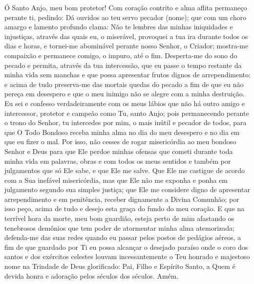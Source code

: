 \documentclass{subfiles}
\begin{document}
Ó Santo Anjo, meu bom protetor! Com coração contrito e alma aflita permaneço
perante ti, pedindo: Dá ouvidos ao teu servo pecador (nome); que com um choro
amargo e lamento profundo clama: Não te lembres das minhas iniquidades e
injustiças, através das quais eu, o miserável, provoquei a tua ira durante todos
os dias e horas, e tornei-me abominável perante nosso Senhor, o Criador;
mostra-me compaixão e permanece comigo, o impuro, até o fim. Desperta-me do sono
do pecado e permita, através da tua intercessão, que eu passe o tempo restante
da minha vida sem manchas e que possa apresentar frutos dignos de
arrependimento; e acima de tudo preserva-me das mortais quedas do pecado a fim
de que eu não pereça em desespero e que o meu inimigo não se alegre com a minha
destruição. Eu sei e confesso verdadeiramente com os meus lábios que não há
outro amigo e intercessor, protetor e campeão como Tu, santo Anjo; pois
permanecendo perante o trono do Senhor, tu intercedes por mim, o mais inútil e
pecador de todos, para que O Todo Bondoso receba minha alma no dia do meu
desespero e no dia em que eu fizer o mal. Por isso, não cesses de rogar
misericórdia ao meu bondoso Senhor e Deus para que Ele perdoe minhas ofensas que
cometi durante toda minha vida em palavras, obras e com todos os meus sentidos e
também por julgamentos que só Ele sabe, e que Ele me salve. Que Ele me castigue
de acordo com a Sua inefável misericórdia, mas que Ele não me exponha e ponha em
julgamento segundo sua simples justiça; que Ele me considere digno de apresentar
arrependimento e em penitência, receber dignamente a Divina Comunhão; por isso
peço, acima de tudo e desejo esta graça do fundo do meu coração. E que na
terrível hora da morte, meu bom guardião, esteja perto de mim afastando os
tenebrosos demônios que tem poder de atormentar minha alma atemorizada;
defenda-me das suas redes quando eu passar pelos postos de pedágios aéreos, a
fim de que guardado por Ti eu possa alcançar o desejado paraíso onde o coro dos
santos e dos exércitos celestes louvam incessantemente o Teu honrado e majestoso
nome na Trindade de Deus glorificado: Pai, Filho e Espírito Santo, a Quem é
devida honra e adoração pelos séculos dos séculos. Amém.
\end{document}
